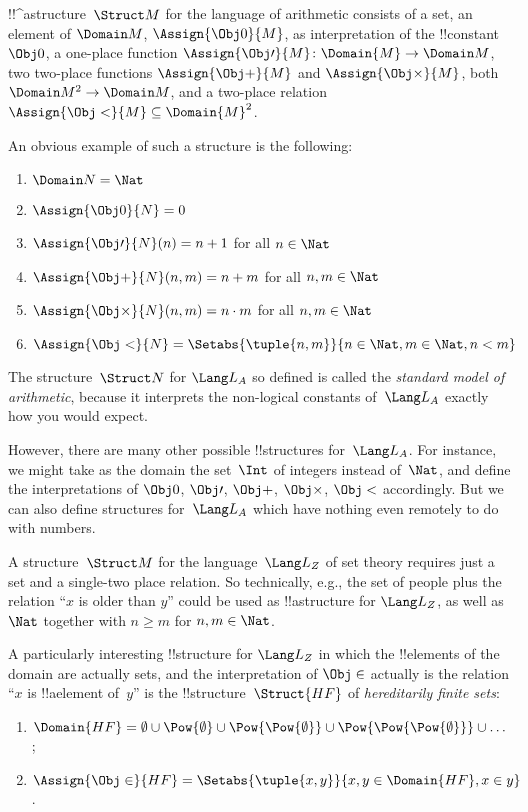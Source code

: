 \documentclass[../../../include/open-logic-section]{subfiles}
\begin{document}
\begin{ex}
!!^a{structure}~$\Struct M$ for the language of arithmetic consists of a
  set, an element of $\Domain M$, $\Assign{\Obj 0}{M}$, as
  interpretation of the !!{constant}~$\Obj 0$, a one-place function
  $\Assign{\Obj \prime}{M} \colon \Domain{M} \to \Domain M$, two
  two-place functions $\Assign{\Obj +}{M}$ and $\Assign{\Obj
    \times}{M}$, both $\Domain M^2 \to \Domain M$, and a two-place
  relation $\Assign{\Obj <}{M} \subseteq \Domain{M}^2$.

An obvious example of such a structure is the following:
\begin{enumerate}
\item $\Domain N = \Nat$
\item $\Assign{\Obj 0}{N} = 0$
\item $\Assign{\Obj \prime}{N}(n) = n + 1$ for all $n \in \Nat$
\item $\Assign{\Obj +}{N}(n, m) = n + m$ for all $n, m \in \Nat$
\item $\Assign{\Obj \times}{N}(n, m) = n\cdot m$ for all $n, m \in \Nat$
\item $\Assign{\Obj <}{N} = \Setabs{\tuple{n, m}}{n \in \Nat, m \in
  \Nat, n < m}$
\end{enumerate}
The structure~$\Struct N$ for $\Lang L_A$ so defined is called the
\emph{standard model of arithmetic}, because it interprets the
non-logical constants of~$\Lang L_A$ exactly how you would expect.

However, there are many other possible !!{structure}s for~$\Lang
L_A$. For instance, we might take as the domain the set~$\Int$ of
integers instead of~$\Nat$, and define the interpretations of $\Obj
0$, $\Obj \prime$, $\Obj +$, $\Obj \times$, $\Obj <$ accordingly.  But
we can also define structures for~$\Lang L_A$ which have nothing even
remotely to do with numbers.
\end{ex}

\begin{ex}
A structure~$\Struct M$ for the language~$\Lang L_Z$ of set theory requires
just a set and a single-two place relation. So technically, e.g., the
set of people plus the relation ``$x$ is older than $y$'' could be
used as !!a{structure} for $\Lang L_Z$, as well as $\Nat$ together
with $n \ge m$ for $n, m \in \Nat$.

A particularly interesting !!{structure} for $\Lang L_Z$ in which the
!!{element}s of the domain are actually sets, and the interpretation
of $\Obj \in$ actually is the relation ``$x$ is !!a{element} of~$y$''
is the !!{structure}~$\Struct{{HF}}$ of \emph{hereditarily finite sets}:
\begin{enumerate}
\item $\Domain{{{HF}}} = \emptyset \cup \Pow{\emptyset} \cup
  \Pow{\Pow{\emptyset}} \cup \Pow{\Pow{\Pow{\emptyset}}} \cup \dots$;
\item $\Assign{\Obj \in}{{{HF}}} = \Setabs{\tuple{x, y}}{x, y \in
  \Domain{{{HF}}}, x \in y}$.
\end{enumerate}
\end{ex}
\end{document}
